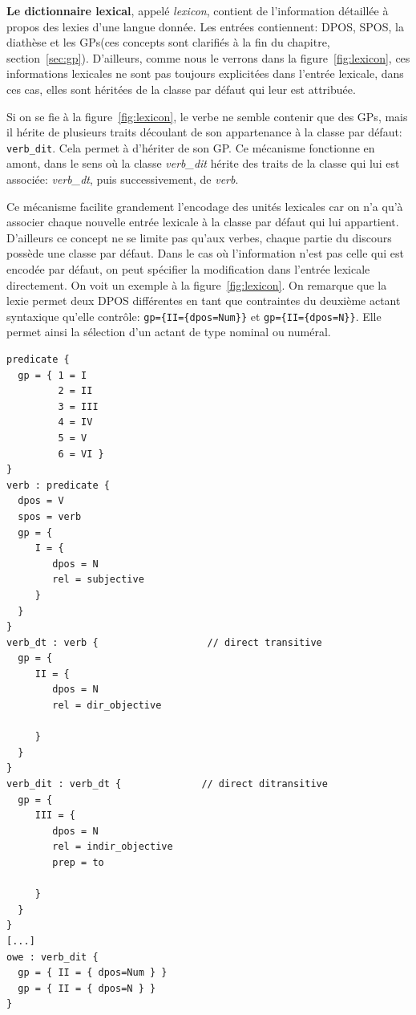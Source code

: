 \textbf{Le dictionnaire lexical}, appelé \emph{lexicon}, contient de l'information détaillée à propos des lexies d'une langue donnée. Les entrées contiennent: \ac{DPOS}, \ac{SPOS}, la diathèse et les \acp{GP}(ces concepts sont clarifiés à la fin du chapitre, section~\ref{sec:gp}).  D'ailleurs, comme nous le verrons dans la figure~\ref{fig:lexicon}, ces informations lexicales ne sont pas toujours explicitées dans l'entrée lexicale, dans ces cas, elles sont héritées de la classe par défaut qui leur est attribuée.

Si on se fie à la figure~\ref{fig:lexicon}, le verbe  ne semble contenir que des \acp{GP}, mais il hérite de plusieurs traits découlant de son appartenance à la classe par défaut: \texttt{verb\_dit}. Cela permet à  d'hériter de son \ac{GP}. Ce mécanisme fonctionne en amont, dans le sens où la classe \emph{verb\_dit} hérite des traits de la classe qui lui est associée: \emph{verb\_dt}, puis successivement, de \emph{verb}.

Ce mécanisme facilite grandement l'encodage des unités lexicales car on n'a qu'à associer chaque nouvelle entrée lexicale à la classe par défaut qui lui appartient. D'ailleurs ce concept ne se limite pas qu'aux verbes, chaque partie du discours possède une classe par défaut. Dans le cas où l'information n'est pas celle qui est encodée par défaut, on peut spécifier la modification dans l'entrée lexicale directement. On voit un exemple à la figure~\ref{fig:lexicon}. On remarque que la lexie  permet deux \ac{DPOS} différentes en tant que contraintes du deuxième actant syntaxique qu'elle contrôle: \lstinline!gp={II={dpos=Num}}! et \lstinline!gp={II={dpos=N}}!. Elle permet ainsi la sélection d'un actant de type nominal ou numéral.

\begin{lstlisting}[language=Xml, caption = Échantillon du \emph{lexicon}, label=fig:lexicon]
predicate {
  gp = { 1 = I
         2 = II
         3 = III
         4 = IV
         5 = V
         6 = VI }
}
verb : predicate {
  dpos = V
  spos = verb
  gp = {
     I = {
        dpos = N
        rel = subjective
     }
  }
}
verb_dt : verb {                   // direct transitive
  gp = {
     II = {
        dpos = N
        rel = dir_objective

     }
  }
}
verb_dit : verb_dt {              // direct ditransitive
  gp = {
     III = {
        dpos = N
        rel = indir_objective
        prep = to  

     }
  }
}
[...]
owe : verb_dit {
  gp = { II = { dpos=Num } }
  gp = { II = { dpos=N } }
}
\end{lstlisting}


